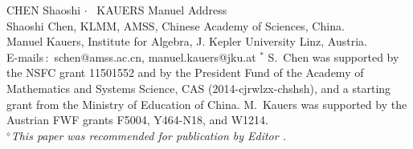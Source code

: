 \documentclass{jssc}
\def\cdd{\mbox{\boldmath$\cdot$}~}
\begin{document}
{ \uppercase{Chen} Shaoshi  \cdd
\uppercase{Kauers} Manuel}%
{Address\\ Shaoshi Chen, KLMM, AMSS, Chinese Academy of Sciences, China.\\
Manuel Kauers, Institute for Algebra, J. Kepler University Linz, Austria.\\
    E-mails\,$:$ schen@amss.ac.cn, manuel.kauers@jku.at} %
{$^*$ S.\ Chen was supported by the NSFC grant 11501552 and
   by the President Fund of the Academy of Mathematics and Systems Science, CAS (2014-cjrwlzx-chshsh), and a starting grant from the Ministry of Education
   of China.
   M.\ Kauers was supported by the Austrian FWF grants F5004, Y464-N18, and W1214.\\
{$^\diamond${\it This paper was recommended for publication by
Editor . }}}


\end{document}

